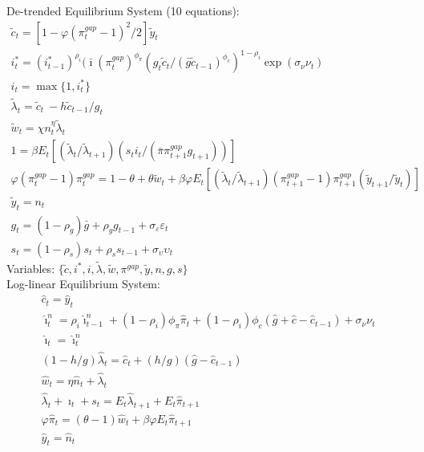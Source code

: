 \documentclass[12pt, final]{article}
\begin{document}
\setcounter{equation}{0}
\noindent De-trended Equilibrium System (10 equations):
\small\begin{gather}
\tilde{c}_t = [1-\varphi(\pi_t^{gap} - 1)^2/2]\tilde{y}_t\\
i_t^*=(i^*_{t-1})^{\rho_i}(\bar{\imath}(\pi_t^{gap})^{\phi_\pi}(g_t\tilde{c}_t/(\bar{g}\tilde{c}_{t-1})^{\phi_c})^{1-\rho_i}\exp(\sigma_\nu\nu_t)\\
i_t=\max\{1,i_t^*\}\\
\tilde{\lambda}_t = \tilde{c}_t\ - h\tilde{c}_{t-1}/g_t\\
\tilde{w}_t = \chi n_t^\eta \tilde{\lambda}_t  \\
  1 = \beta E_t[(\tilde{\lambda}_t/\tilde{\lambda}_{t+1})(s_ti_t/(\bar{\pi}\pi_{t+1}^{gap}g_{t+1}))]\\
  \varphi(\pi_t^{gap}-1){\pi}_t^{gap} = 1-\theta + \theta\tilde{w}_t + \beta\varphi E_t[(\tilde{\lambda}_t/\tilde{\lambda}_{t+1}) (\pi_{t+1}^{gap}-1)\pi_{t+1}^{gap}(\tilde{y}_{t+1}/\tilde{y}_t)]\\
  \tilde{y}_t= n_t\\  
  g_t= (1-\rho_g)\bar{g}+\rho_gg_{t-1} + \sigma_\varepsilon\varepsilon_t \\
  s_t=(1-\rho_s)s_t+\rho_ss_{t-1} + \sigma_\upsilon\upsilon_t
\end{gather}
Variables: $\{\tilde{c},i^*,i,\tilde{\lambda},\tilde{w},\pi^{gap},\tilde{y},n,g,s\}$\\ 

\setcounter{equation}{0}
\noindent Log-linear Equilibrium System:
\begin{gather}
  \hat{c}_t = \hat{y}_t\\
  \hat{\imath}_t^n = \rho_i\hat{\imath}^n_{t-1} + (1-\rho_i)\phi_\pi\hat{\pi}_t+ (1-\rho_i)\phi_c(\hat{g}+\hat{c}-\hat{c}_{t-1})+\sigma_\nu\nu_t \\
  \hat{\imath}_t = \hat{\imath}_t^n\\
  (1-h/g)\hat{\lambda}_t = \hat{c}_t + (h/g)(\hat{g} - \hat{c}_{t-1})\\
  \hat{w}_t =  \eta\hat{n}_t + \hat{\lambda}_t\\
  \hat{\lambda}_t + \hat{\imath}_t + s_t  = E_t\hat{\lambda}_{t+1}+E_t\hat{\pi}_{t+1} \\
  \varphi\hat{\pi}_t = (\theta-1)\hat{w}_t+\beta\varphi E_t\hat{\pi}_{t+1}\\
  \hat{y}_t = \hat{n}_t 
\end{gather}
\pagebreak
\setcounter{equation}{0}
\end{document}
